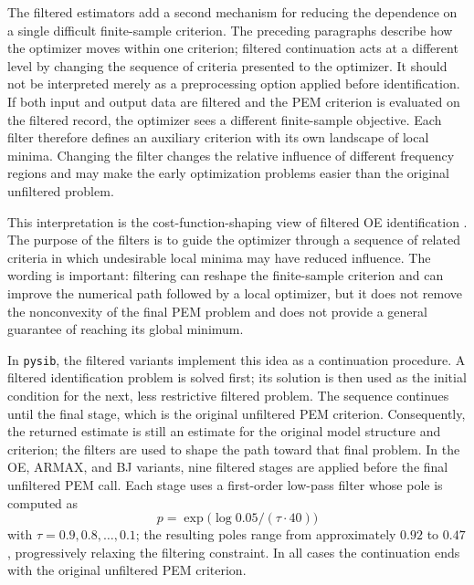 \documentclass{ifacconf}
\begin{document}
The filtered estimators add a second mechanism for reducing the dependence on a
single difficult finite-sample criterion.  The preceding paragraphs describe how
the optimizer moves within one criterion; filtered continuation acts at a
different level by changing the sequence of criteria presented to the optimizer.
It should not be interpreted merely as a preprocessing option applied before
identification.  If both input and output data are filtered and the PEM
criterion is evaluated on the filtered record, the optimizer sees a different
finite-sample objective.  Each filter therefore defines an auxiliary criterion
with its own landscape of local minima.  Changing the filter changes the
relative influence of different frequency regions and may make the early
optimization problems easier than the original unfiltered problem.

This interpretation is the cost-function-shaping view of filtered OE
identification \citep{eckhard2011global,eckhard2013input,eckhard2017cost}.  The purpose of the
filters is to guide the optimizer through a sequence of related criteria in
which undesirable local minima may have reduced influence.  The wording is
important: filtering can reshape the finite-sample criterion and can improve the
numerical path followed by a local optimizer, but it does not remove the
nonconvexity of the final PEM problem and does not provide a general guarantee
of reaching its global minimum.

In \texttt{pysib}, the filtered variants implement this idea as a continuation
procedure.  A filtered identification problem is solved first; its solution is
then used as the initial condition for the next, less restrictive filtered
problem.  The sequence continues until the final stage, which is the original
unfiltered PEM criterion.  Consequently, the returned estimate is still an
estimate for the original model structure and criterion; the filters are used to
shape the path toward that final problem.  In the OE, ARMAX, and BJ variants,
nine filtered stages are applied before the final unfiltered PEM call.  Each
stage uses a
first-order low-pass filter whose pole is computed as
\begin{equation}
  p = \exp\bigl(\log 0.05/(\tau\cdot 40)\bigr)
  \label{eq:oe-pole}
\end{equation}
with \(\tau=0.9,0.8,\ldots,0.1\); the
resulting poles range from approximately \(0.92\) to \(0.47\), progressively
relaxing the filtering constraint.  In all cases the continuation ends with
the original unfiltered PEM criterion.
\end{document}
